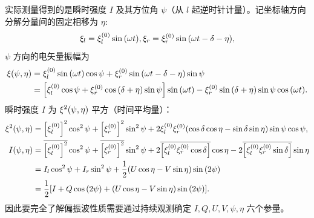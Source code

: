 \documentclass[../天体物理基础.tex]{subfiles}
\begin{document}
实际测量得到的是瞬时强度 $I$ 及其方位角 $\psi$（从 $l$ 起逆时针计量）。记坐标轴方向分解分量间的固定相移为 $\eta$:
\begin{equation}
\xi_{l}=\xi_{l}^{\mleft(0\mright)}\sin{\mleft(\omega t\mright)},\xi_{r}=\xi_{r}^{\mleft(0\mright)}\sin{\mleft(\omega t-\delta-\eta\mright)},
\end{equation}
$\psi$ 方向的电矢量振幅为
\begin{align}
\xi\mleft(\psi,\eta\mright)&=\xi_{l}^{\mleft(0\mright)}\sin{\mleft(\omega t\mright)}\cos{\psi}+\xi_{r}^{\mleft(0\mright)}\sin{\mleft(\omega t-\delta-\eta\mright)}\sin{\psi}\notag\\
&=\mleft[\xi_{l}^{\mleft(0\mright)}\cos{\psi}+\xi_{r}^{\mleft(0\mright)}\cos{\mleft(\delta+\eta\mright)}\sin{\psi}\mright]\sin{\mleft(\omega t\mright)}-\xi_{r}^{\mleft(0\mright)}\sin{\mleft(\delta+\eta\mright)}\sin{\psi}\cos{\mleft(\omega t\mright)}.
\end{align}
瞬时强度 $I$ 为 $\xi^{2}\mleft(\psi,\eta\mright)$ 平方（时间平均量）：
\begin{align}
\xi^{2}\mleft(\psi,\eta\mright)&=\mleft[\xi_{l}^{\mleft(0\mright)}\mright]^{2}\cos^{2}{\psi}+\mleft[\xi_{r}^{\mleft(0\mright)}\mright]^{2}\sin^{2}{\psi}+2\xi_{l}^{\mleft(0\mright)}\xi_{r}^{\mleft(0\mright)}\mleft(\cos{\delta}\cos{\eta}-\sin{\delta}\sin{\eta}\mright)\sin{\psi}\cos{\psi},\\
I\mleft(\psi,\eta\mright)&=\overline{\mleft[\xi_{l}^{\mleft(0\mright)}\mright]^{2}}\cos^{2}{\psi}+\overline{\mleft[\xi_{r}^{\mleft(0\mright)}\mright]^{2}}\sin^{2}{\psi}+2\overline{\mleft[\xi_{l}^{\mleft(0\mright)}\xi_{r}^{\mleft(0\mright)}\cos{\delta}\mright]}\cos{\eta}-2\overline{\mleft[\xi_{l}^{\mleft(0\mright)}\xi_{r}^{\mleft(0\mright)}\sin{\delta}\mright]}\sin{\eta}\notag\\
&=I_{l}\cos^{2}{\psi}+I_{r}\sin^{2}{\psi}+\frac{1}{2}\mleft(U\cos{\eta}-V\sin{\eta}\mright)\sin{\mleft(2\psi\mright)}\notag\\
&=\frac{1}{2}\mleft[I+Q\cos{\mleft(2\psi\mright)}+\mleft(U\cos{\eta}-V\sin{\eta}\mright)\sin{\mleft(2\psi\mright)}\mright].
\end{align}
因此要完全了解偏振波性质需要通过持续观测确定 $I, Q, U, V,\psi,\eta$ 六个参量。
\end{document}

